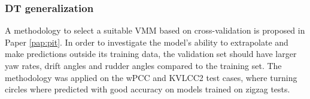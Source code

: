 \subsubsection*{DT generalization}
A methodology to select a suitable VMM based on cross-validation is proposed in Paper \ref{pap:pit}. In order to investigate the model's ability to extrapolate and make predictions outside its training data, the validation set should have larger yaw rates, drift angles and rudder angles compared to the training set. The methodology was applied on the wPCC and KVLCC2 test cases, where turning circles where predicted with good accuracy on models trained on zigzag tests. 
